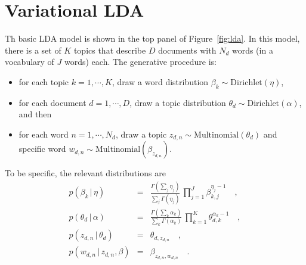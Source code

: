\documentclass[11pt]{article}
\newcommand{\fig}[1]{Figure~\ref{fig:#1}}
\begin{document}
\section{Variational LDA}

Th basic LDA model is shown in the top panel of \fig{lda}.
In this model, there is a set of $K$ topics that describe $D$ documents with
$N_d$ words (in a vocabulary of $J$ words) each.
The generative procedure is:
\begin{itemize}
\item{for each topic $k=1,\cdots,K$, draw a word distribution
$\beta_k \sim \mathrm{Dirichlet}(\eta)$,}
\item{for each document $d=1,\cdots,D$, draw a topic distribution $\theta_d
\sim \mathrm{Dirichlet}(\alpha)$, and then}
\item{for each word $n=1,\cdots,N_d$, draw a topic
$z_{d,n}\sim\mathrm{Multinomial}(\theta_d)$ and specific word
$w_{d,n}\sim\mathrm{Multinomial}(\beta_{z_{d,n}})$.}
\end{itemize}
To be specific, the relevant distributions are
\begin{eqnarray}
p(\beta_k\,|\,\eta) &=&
\frac{\Gamma\left( \sum_j \eta_j \right)}{\sum_j \Gamma(\eta_j)} \,
\prod_{j=1}^J \beta_{k,j}^{\eta_j-1} \quad, \\
p(\theta_d\,|\,\alpha) &=&
\frac{\Gamma\left( \sum_k \alpha_k \right)}{\sum_k \Gamma(\alpha_k)} \,
\prod_{k=1}^K \theta_{d,k}^{\alpha_k-1} \quad, \\
p(z_{d,n}\,|\,\theta_d) &=& \theta_{d,z_{d,n}} \quad, \\
p(w_{d,n}\,|\,z_{d,n},\beta) &=& \beta_{z_{d,n},w_{d,n}} \quad.
\end{eqnarray}
\end{document}
